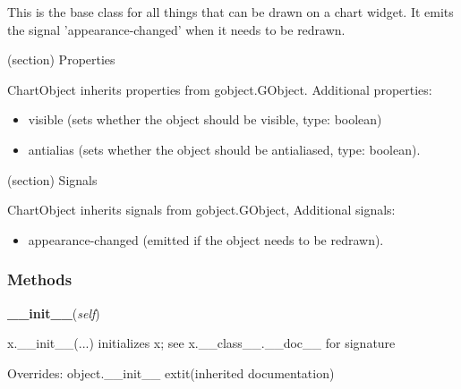 This is the base class for all things that can be drawn on a chart widget. 
It emits the signal 'appearance-changed' when it needs to be redrawn.

(section) Properties

  ChartObject inherits properties from gobject.GObject. Additional 
  properties:

  \begin{itemize}
  \setlength{\parskip}{0.6ex}
    \item visible (sets whether the object should be visible, type: boolean)

    \item antialias (sets whether the object should be antialiased, type: 
      boolean).

  \end{itemize}

(section) Signals

  ChartObject inherits signals from gobject.GObject, Additional signals:

  \begin{itemize}
  \setlength{\parskip}{0.6ex}
    \item appearance-changed (emitted if the object needs to be redrawn).

  \end{itemize}



  \subsubsection{Methods}

    \vspace{0.5ex}

\hspace{.8\funcindent}\begin{boxedminipage}{\funcwidth}

    \raggedright \textbf{\_\_init\_\_}(\textit{self})

\setlength{\parskip}{2ex}
    x.\_\_init\_\_(...) initializes x; see x.\_\_class\_\_.\_\_doc\_\_ for 
    signature

\setlength{\parskip}{1ex}
      Overrides: object.\_\_init\_\_ 	extit{(inherited documentation)}

    \end{boxedminipage}

